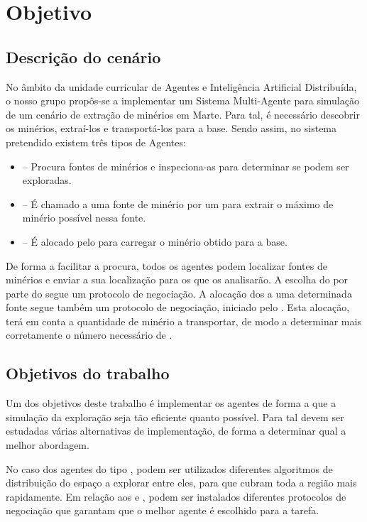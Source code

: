 \documentclass[12pt]{report}
\begin{document}
\chapter{Objetivo}

\section{Descrição do cenário}
No âmbito da unidade curricular de Agentes e Inteligência Artificial Distribuída, o nosso grupo propôs-se a implementar um Sistema Multi-Agente para simulação de um cenário de extração de minérios em Marte. Para tal, é necessário descobrir os minérios, extraí-los e transportá-los para a base. Sendo assim, no sistema pretendido existem três tipos de Agentes:

\begin{itemize}
	\item \Spotter – Procura fontes de minérios e inspeciona-as para determinar se podem ser exploradas. 
	\item \Producer – É chamado a uma fonte de minério por um \spotter para extrair o máximo de minério possível nessa fonte. 
	\item \Transporter – É alocado pelo \producer para carregar o minério obtido para a base.
\end{itemize}

De forma a facilitar a procura, todos os agentes podem localizar fontes de minérios e enviar a sua localização para os \spotters que os analisarão. A escolha do \producer por parte do \spotter segue um protocolo de negociação. A alocação dos \transporters a uma determinada fonte segue também um protocolo de negociação, iniciado pelo \producer. Esta alocação, terá em conta a quantidade de minério a transportar, de modo a determinar mais corretamente o número necessário de \transporters.

\section{Objetivos do trabalho}

Um dos objetivos deste trabalho é implementar os agentes de forma a que a simulação da exploração seja tão eficiente quanto possível. Para tal devem ser estudadas várias alternativas de implementação, de forma a determinar qual a melhor abordagem. 

No caso dos agentes do tipo \spotter, podem ser utilizados diferentes algoritmos de distribuição do espaço a explorar entre eles, para que cubram toda a região mais rapidamente. Em relação aos \producers e \transporters, podem ser instalados diferentes protocolos de negociação que garantam que o melhor agente é escolhido para a tarefa.
\end{document}
